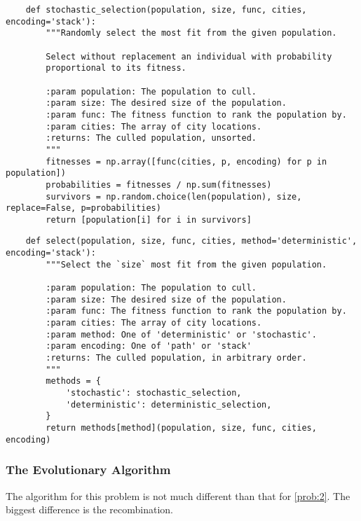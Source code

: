 \documentclass{article}
\begin{document}
\begin{verbatim}
    def stochastic_selection(population, size, func, cities, encoding='stack'):
        """Randomly select the most fit from the given population.

        Select without replacement an individual with probability
        proportional to its fitness.

        :param population: The population to cull.
        :param size: The desired size of the population.
        :param func: The fitness function to rank the population by.
        :param cities: The array of city locations.
        :returns: The culled population, unsorted.
        """
        fitnesses = np.array([func(cities, p, encoding) for p in population])
        probabilities = fitnesses / np.sum(fitnesses)
        survivors = np.random.choice(len(population), size, replace=False, p=probabilities)
        return [population[i] for i in survivors]
\end{verbatim}

\begin{verbatim}
    def select(population, size, func, cities, method='deterministic', encoding='stack'):
        """Select the `size` most fit from the given population.

        :param population: The population to cull.
        :param size: The desired size of the population.
        :param func: The fitness function to rank the population by.
        :param cities: The array of city locations.
        :param method: One of 'deterministic' or 'stochastic'.
        :param encoding: One of 'path' or 'stack'
        :returns: The culled population, in arbitrary order.
        """
        methods = {
            'stochastic': stochastic_selection,
            'deterministic': deterministic_selection,
        }
        return methods[method](population, size, func, cities, encoding)
\end{verbatim}

\subsubsection{The Evolutionary Algorithm}
The algorithm for this problem is not much different than that for \autoref{prob:2}. The biggest
difference is the recombination.
\end{document}
